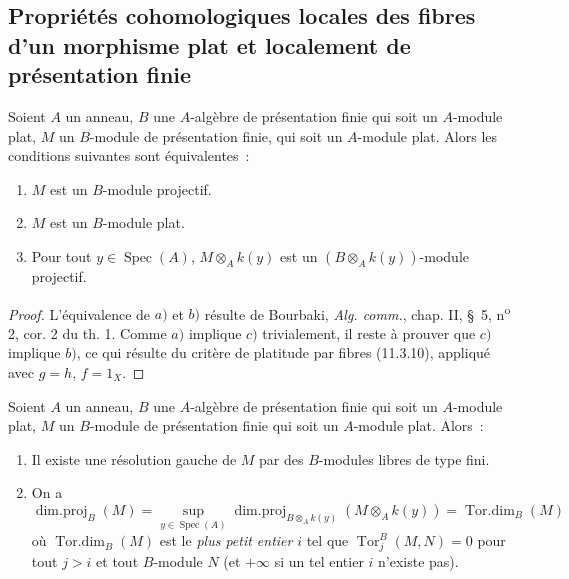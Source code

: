 \subsection{Propriétés cohomologiques locales des fibres d'un morphisme plat et
localement de présentation finie}
\label{subsection:IV.12.3-fr}

\begin{lemma}[12.3.1]
\label{IV.12.3.1-fr}
Soient $A$ un anneau, $B$ une $A$-algèbre de présentation finie qui soit un
$A$-module plat, $M$ un $B$-module de présentation finie, qui soit un
$A$-module plat. Alors les conditions suivantes sont équivalentes~:
\begin{enumerate}[label=\emph{\alph*)}]
  \item $M$ est un $B$-module projectif.
  \item $M$ est un $B$-module plat.
  \item Pour tout $y\in\operatorname{Spec}(A)$, $M\otimes_Ak(y)$ est un
  $(B\otimes_Ak(y))$-module projectif.
\end{enumerate}
\end{lemma}

\begin{proof}
L'équivalence de $a)$ et $b)$ résulte de Bourbaki, \emph{Alg. comm.}, chap. II,
\S~5, n\textsuperscript{o} 2, cor. 2 du th. 1. Comme $a)$ implique $c)$
trivialement, il reste à prouver que $c)$ implique $b)$, ce qui résulte du
critère de platitude par fibres (11.3.10), appliqué avec $g=h$, $f=1_X$.
\end{proof}

\begin{proposition}[12.3.2]
\label{IV.12.3.2-fr}
Soient $A$ un anneau, $B$ une $A$-algèbre de présentation finie qui soit un
$A$-module plat, $M$ un $B$-module de présentation finie qui soit un
$A$-module plat. Alors~:
\begin{enumerate}[label=(\roman*)]
  \item Il existe une résolution gauche de $M$ par des $B$-modules libres de
  type fini.
  \item On a
  \begin{equation}
    \tag{12.3.2.1}
    \label{IV.12.3.2.1-fr}
    \operatorname{dim.proj}_B(M)
    =\sup_{y\in\operatorname{Spec}(A)}
    \operatorname{dim.proj}_{B\otimes_Ak(y)}(M\otimes_Ak(y))
    =\operatorname{Tor.dim}_B(M)
  \end{equation}
  où $\operatorname{Tor.dim}_B(M)$ est le \emph{plus petit entier} $i$ tel que
  $\operatorname{Tor}^B_j(M,N)=0$ pour tout $j>i$ et tout $B$-module $N$
  (et $+\infty$ si un tel entier $i$ n'existe pas).
\end{enumerate}
\end{proposition}

